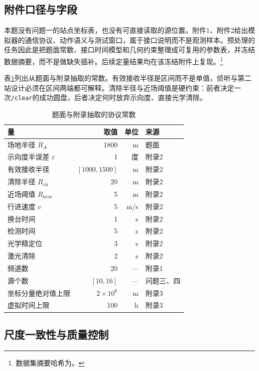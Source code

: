 \documentclass{cumcmthesis}
\begin{document}
\subsection{附件口径与字段}

本题没有问题一的站点坐标表，也没有可直接读取的源位置。附件1、附件2给出模拟器的通信协议、动作语义与测试窗口，属于接口说明而不是观测样本。预处理的任务因此是把题面常数、接口时间模型和几何约束整理成可复用的参数表，并冻结数据摘要，而不是做缺失插补。后续定量结果均在该冻结附件上复现。\footnote{数据集摘要哈希为。}

表\ref{tab:protocol}列出从题面与附录抽取的常数。有效接收半径是区间而不是单值，侦听与第二站设计必须在区间两端都可解释。清除半径与近场阈值是硬约束：前者决定一次\texttt{/clear}的成功圆盘，后者决定何时放弃示向度、直接光学清除。

\begin{table}[htbp]
\centering
\caption{题面与附录抽取的协议常数}
\label{tab:protocol}
\begin{tabular}{lrrl}
\toprule
量 & 取值 & 单位 & 来源 \\
\midrule
场地半径 $R_A$ & 1800 & m & 题面 \\
示向度半误差 $\varepsilon$ & 1 & 度 & 附录2 \\
有效接收半径 & $[1000,1500]$ & m & 附录2 \\
清除半径 $R_{\mathrm{clr}}$ & 20 & m & 附录2 \\
近场阈值 $R_{\mathrm{near}}$ & 5 & m & 附录2 \\
行进速度 $v$ & 5 & m/s & 附录2 \\
换台时间 & 1 & s & 附录2 \\
检测时间 & 5 & s & 附录2 \\
光学精定位 & 3 & s & 附录2 \\
激光清除 & 2 & s & 附录2 \\
频道数 & 20 & --- & 附录1 \\
源个数 & $[10,16]$ & --- & 问题三、四 \\
坐标分量绝对值上限 & $2\times 10^6$ & m & 附录3 \\
虚拟时间上限 & 100 & h & 附录3 \\
\bottomrule
\end{tabular}
\end{table}

\subsection{尺度一致性与质量控制}
\end{document}
